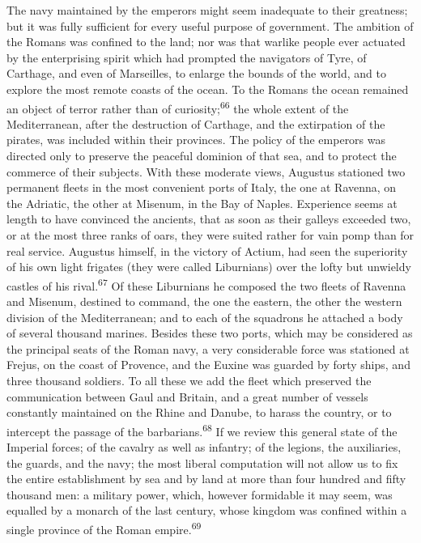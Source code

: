 The navy maintained by the emperors might seem inadequate to
their greatness; but it was fully sufficient for every useful
purpose of government. The ambition of the Romans was confined to
the land; nor was that warlike people ever actuated by the
enterprising spirit which had prompted the navigators of Tyre, of
Carthage, and even of Marseilles, to enlarge the bounds of the
world, and to explore the most remote coasts of the ocean. To the
Romans the ocean remained an object of terror rather than of
curiosity;\textsuperscript{66} the whole extent of the Mediterranean, after the
destruction of Carthage, and the extirpation of the pirates, was
included within their provinces. The policy of the emperors was
directed only to preserve the peaceful dominion of that sea, and
to protect the commerce of their subjects. With these moderate
views, Augustus stationed two permanent fleets in the most
convenient ports of Italy, the one at Ravenna, on the Adriatic,
the other at Misenum, in the Bay of Naples. Experience seems at
length to have convinced the ancients, that as soon as their
galleys exceeded two, or at the most three ranks of oars, they
were suited rather for vain pomp than for real service. Augustus
himself, in the victory of Actium, had seen the superiority of
his own light frigates (they were called Liburnians) over the
lofty but unwieldy castles of his rival.\textsuperscript{67} Of these Liburnians
he composed the two fleets of Ravenna and Misenum, destined to
command, the one the eastern, the other the western division of
the Mediterranean; and to each of the squadrons he attached a
body of several thousand marines. Besides these two ports, which
may be considered as the principal seats of the Roman navy, a
very considerable force was stationed at Frejus, on the coast of
Provence, and the Euxine was guarded by forty ships, and three
thousand soldiers. To all these we add the fleet which preserved
the communication between Gaul and Britain, and a great number of
vessels constantly maintained on the Rhine and Danube, to harass
the country, or to intercept the passage of the barbarians.\textsuperscript{68} If
we review this general state of the Imperial forces; of the
cavalry as well as infantry; of the legions, the auxiliaries, the
guards, and the navy; the most liberal computation will not allow
us to fix the entire establishment by sea and by land at more
than four hundred and fifty thousand men: a military power,
which, however formidable it may seem, was equalled by a monarch
of the last century, whose kingdom was confined within a single
province of the Roman empire.\textsuperscript{69}

